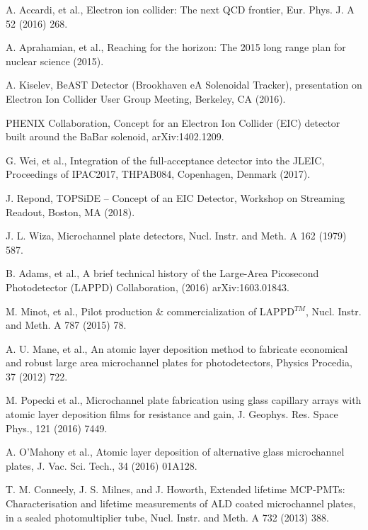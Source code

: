 \documentclass[preprint,5p]{elsarticle}
\begin{document}
\begin{thebibliography}{00}

A. Accardi, et al., Electron ion collider: The next QCD frontier, Eur. Phys.  
      J. A 52 (2016) 268.

A. Aprahamian, et al., Reaching for the horizon: The 2015 long range plan for 
      nuclear science (2015).

A. Kiselev, BeAST Detector (Brookhaven eA Solenoidal Tracker), presentation on 
      Electron Ion Collider User Group Meeting, Berkeley, CA (2016).

PHENIX Collaboration, Concept for an Electron Ion Collider (EIC) detector built 
      around the BaBar solenoid, arXiv:1402.1209.

G. Wei, et al., Integration of the full-acceptance detector into the JLEIC, 
      Proceedings of IPAC2017, THPAB084, Copenhagen, Denmark (2017).

J. Repond, TOPSiDE – Concept of an EIC Detector, Workshop on Streaming Readout, 
      Boston, MA (2018).

J. L. Wiza, Microchannel plate detectors, Nucl. Instr. and Meth. A 162 (1979) 
      587.

B. Adams, et al., A brief technical history of the Large-Area Picosecond 
      Photodetector (LAPPD) Collaboration, (2016) arXiv:1603.01843.

M. Minot, et al., Pilot production \& commercialization of LAPPD$^{𝑇𝑀}$, Nucl.  
      Instr. and Meth. A 787 (2015) 78.

A. U. Mane, et al., An atomic layer deposition method to fabricate economical and robust large area microchannel plates for photodetectors, Physics Procedia, 37 (2012) 722.

M. Popecki et al., Microchannel plate fabrication using glass capillary arrays 
      with atomic layer deposition films for resistance and gain, J.  Geophys.  
      Res. Space Phys., 121 (2016) 7449.

A. O'Mahony et al., Atomic layer deposition of alternative glass microchannel 
      plates, J. Vac. Sci. Tech., 34 (2016) 01A128.

T. M. Conneely, J. S. Milnes, and J. Howorth, Extended lifetime MCP-PMTs: 
      Characterisation and lifetime measurements of ALD coated microchannel 
      plates, in a sealed photomultiplier tube, Nucl. Instr. and Meth. A 732 
      (2013) 388.


\end{thebibliography}
\end{document}
